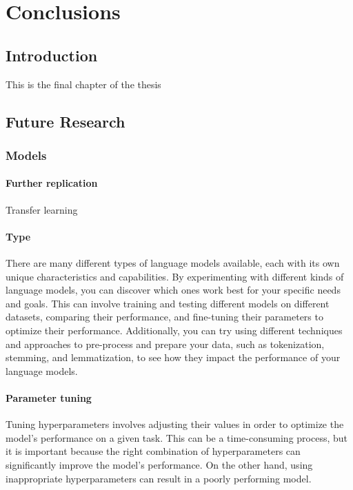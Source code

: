 \chapter{Conclusions}

\section{Introduction} This is the final chapter of the thesis 

\section{Future Research}




\subsection{Models} 

\subsubsection{Further replication} Transfer learning
\subsubsection{Type} There are many different types of language models available, each with its own unique characteristics and capabilities. By experimenting with different kinds of language models, you can discover which ones work best for your specific needs and goals. This can involve training and testing different models on different datasets, comparing their performance, and fine-tuning their parameters to optimize their performance. Additionally, you can try using different techniques and approaches to pre-process and prepare your data, such as tokenization, stemming, and lemmatization, to see how they impact the performance of your language models.
\subsubsection{Parameter tuning} Tuning hyperparameters involves adjusting their values in order to optimize the model's performance on a given task. This can be a time-consuming process, but it is important because the right combination of hyperparameters can significantly improve the model's performance. On the other hand, using inappropriate hyperparameters can result in a poorly performing model.

